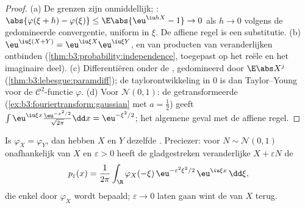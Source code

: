 \begin{proof}
(a) De grenzen zijn onmiddellijk; : $\abs{\varphi(\xi
+ h) - \varphi(\xi)} \leq \E\abs{\eu^{\iu hX} - 1} \to 0$ als $h
\to 0$ volgens de gedomineerde convergentie, uniform in $\xi$. De
affiene regel is een substitutie. (b) $\eu^{\iu\xi(X+Y)} =
\eu^{\iu\xi X}\eu^{\iu\xi Y}$, en  van
producten van  veranderlijken ontbinden
(\cref{thm:b3:probability:independence}, toegepast op het reële
en het imaginaire deel). (c) Differentiëren onder de
, gedomineerd door $\E\abs X^j$
(\cref{thm:b3:lebesgue:paramdiff}); de taylorontwikkeling in $0$
is dan Taylor--Young voor de $\mathcal C^2$-functie $\varphi$.
(d) Voor $\mathcal N(0,1)$: de  getransformeerde
(\cref{ex:b3:fouriertransform:gaussian} met $a = \frac12$) geeft
$\int\eu^{\iu\xi x}\frac{\eu^{-x^2/2}}{\sqrt{2\pi}}\dd x =
\eu^{-\xi^2/2}$; het algemene geval met de affiene regel.
\end{proof}

\begin{theorem}[Injectiviteit]\label{thm:b3:clt:injectivity}
Is $\varphi_X = \varphi_Y$, dan hebben $X$ en $Y$ dezelfde
. Preciezer: voor $N \sim \mathcal N(0,1)$ onafhankelijk
van $X$ en $\varepsilon > 0$ heeft de gladgestreken
veranderlijke $X + \varepsilon N$ de 
\[
p_\varepsilon(x) = \frac1{2\pi}\int_\R
\varphi_X(-\xi)\,\eu^{-\varepsilon^2\xi^2/2}\,
\eu^{\iu\xi x}\,\dd\xi ,
\]
die enkel door $\varphi_X$ wordt bepaald; $\varepsilon \to 0$
laten gaan wint de  van $X$
terug.
\end{theorem}

